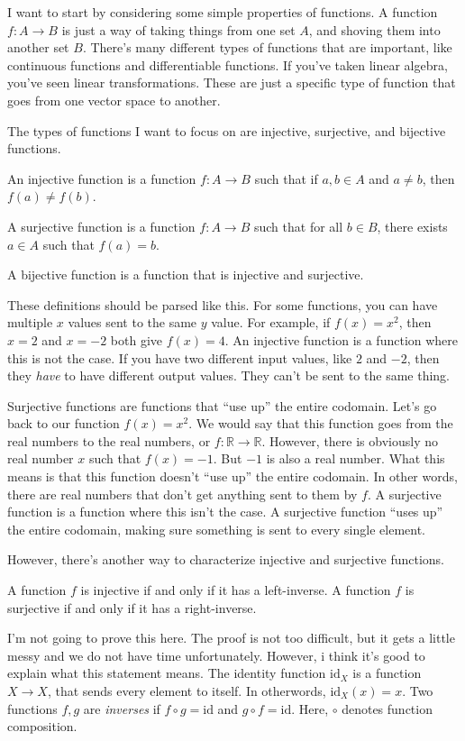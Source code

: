 \documentclass[11pt, letterpaper]{article}
\begin{document}
I want to start by considering some simple properties of functions. A function $f : A \to B$ is just a way of taking things from one set $A$, and shoving them into another set $B$. There's many different types of functions that are important, like continuous functions and differentiable functions. If you've taken linear algebra, you've seen linear transformations. These are just a specific type of function that goes from one vector space to another.

The types of functions I want to focus on are injective, surjective, and bijective functions.
\begin{definition}\label{dfn:1}
	An injective function is a function $f : A \to B$ such that if $a,b\in A$ and $a\neq b$, then $f(a)\neq f(b)$.

	A surjective function is a function $f : A \to B$ such that for all $b\in B$, there exists $a\in A$ such that $f(a)=b$.

	A bijective function is a function that is injective and surjective.
\end{definition}

These definitions should be parsed like this. For some functions, you can have multiple $x$ values sent to the same $y$ value. For example, if $f(x)=x^2$, then $x=2$ and $x=-2$ both give $f(x)=4$. An injective function is a function where this is not the case. If you have two different input values, like $2$ and $-2$, then they \emph{have} to have different output values. They can't be sent to the same thing.

Surjective functions are functions that ``use up'' the entire codomain. Let's go back to our function $f(x)=x^2$. We would say that this function goes from the real numbers to the real numbers, or $f : \mathbb{R}  \to \mathbb{R} $. However, there is obviously no real number $x$ such that $f(x)=-1$. But $-1$ is also a real number. What this means is that this function doesn't ``use up'' the entire codomain. In other words, there are real numbers that don't get anything sent to them by $f$. A surjective function is a function where this isn't the case. A surjective function ``uses up'' the entire codomain, making sure something is sent to every single element.

However, there's another way to characterize injective and surjective functions.

\begin{lemma}\label{lma:1}
	A function $f$ is injective if and only if it has a left-inverse. A function $f$ is surjective if and only if it has a right-inverse.
\end{lemma}
I'm not going to prove this here. The proof is not too difficult, but it gets a little messy and we do not have time unfortunately. However, i think it's good to explain what this statement means. The identity function $\mathrm{id}_X$ is a function $X \to X$, that sends every element to itself. In otherwords, $\mathrm{id}_X(x)=x$. Two functions $f,g$ are \emph{inverses} if $f\circ g=\mathrm{id} $ and $g\circ f=\mathrm{id} $. Here, $\circ $ denotes function composition.
\end{document}
